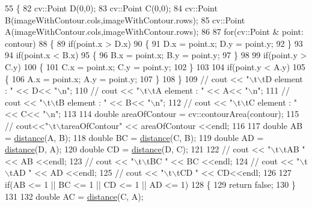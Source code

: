 \begin{DoxyCode}
55 \{
82     cv::Point D(0,0);
83     cv::Point C(0,0);
84     cv::Point B(imageWithContour.cols,imageWithContour.rows);
85     cv::Point A(imageWithContour.cols,imageWithContour.rows);
86 
87     \textcolor{keywordflow}{for}(cv::Point & point: contour)
88     \{
89         \textcolor{keywordflow}{if}(point.x > D.x)
90         \{
91             D.x = point.x; D.y = point.y;
92         \}
93 
94         \textcolor{keywordflow}{if}(point.x < B.x)
95         \{
96             B.x = point.x; B.y = point.y;
97         \}
98 
99         \textcolor{keywordflow}{if}(point.y > C.y)
100         \{
101             C.x = point.x; C.y = point.y;
102         \}
103 
104         \textcolor{keywordflow}{if}(point.y < A.y)
105         \{
106             A.x = point.x; A.y = point.y;
107         \}
108     \}
109 \textcolor{comment}{//    cout << "\(\backslash\)t\(\backslash\)tD element : " << D<< "\(\backslash\)n";}
110 \textcolor{comment}{//    cout << "\(\backslash\)t\(\backslash\)tA element : " << A<< "\(\backslash\)n";}
111 \textcolor{comment}{//    cout << "\(\backslash\)t\(\backslash\)tB element : " << B<< "\(\backslash\)n";}
112 \textcolor{comment}{//    cout << "\(\backslash\)t\(\backslash\)tC element : " << C<< "\(\backslash\)n";}
113 
114     \textcolor{keywordtype}{double} areaOfContour = cv::contourArea(contour);
115 \textcolor{comment}{//    cout<<"\(\backslash\)t\(\backslash\)tareaOfContour" << areaOfContour <<endl;}
116 
117     \textcolor{keywordtype}{double} AB = \hyperlink{class_contour_analis_a4f99f88069c6a746805275d21acdf5b2}{distance}(A, B);
118     \textcolor{keywordtype}{double} BC = \hyperlink{class_contour_analis_a4f99f88069c6a746805275d21acdf5b2}{distance}(C, B);
119     \textcolor{keywordtype}{double} AD = \hyperlink{class_contour_analis_a4f99f88069c6a746805275d21acdf5b2}{distance}(D, A);
120     \textcolor{keywordtype}{double} CD = \hyperlink{class_contour_analis_a4f99f88069c6a746805275d21acdf5b2}{distance}(D, C);
121 
122 \textcolor{comment}{//    cout << "\(\backslash\)t\(\backslash\)tAB " << AB <<endl;}
123 \textcolor{comment}{//    cout << "\(\backslash\)t\(\backslash\)tBC " << BC <<endl;}
124 \textcolor{comment}{//    cout << "\(\backslash\)t\(\backslash\)tAD " << AD <<endl;}
125 \textcolor{comment}{//    cout << "\(\backslash\)t\(\backslash\)tCD " << CD<<endl;}
126 
127     \textcolor{keywordflow}{if}(AB <= 1 || BC <= 1 || CD <= 1 || AD <= 1)
128     \{
129         \textcolor{keywordflow}{return} \textcolor{keyword}{false};
130     \}
131 
132     \textcolor{keywordtype}{double} AC = \hyperlink{class_contour_analis_a4f99f88069c6a746805275d21acdf5b2}{distance}(C, A);

\end{DoxyCode}
